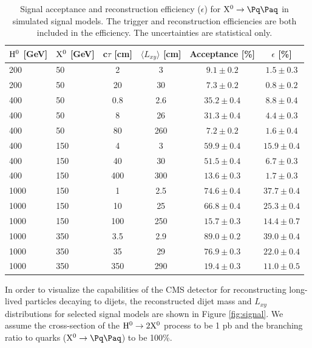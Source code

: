 \begin{table}[htbp]
\caption{
Signal acceptance and reconstruction efficiency ($\epsilon$) for $\X \to \qq$ in simulated signal models.
The trigger and reconstruction efficiencies are both included in the efficiency.
The uncertainties are statistical only.\label{tab:sigeff}}
\centering
\begin{tabular}{llcccc}
\hline
$\mathrm{H}^{0}$ [GeV] & $\mathrm{X^{0}}$ [GeV] & c$\tau$ [cm] & $\langle L_{xy} \rangle$ [cm] & Acceptance [\%] & $\epsilon$ [\%] \\
\hline
200 & 50 & 2 & 3 & $9.1\pm0.2$ & $1.5\pm0.3$ \\
200 & 50 & 20 & 30 & $7.3\pm0.2$ & $0.8\pm0.2$ \\
\hline
400 & 50 & 0.8 & 2.6 & $35.2\pm0.4$ & $8.8\pm0.4$ \\
400 & 50 & 8 & 26 & $31.3\pm0.4$ & $4.4\pm0.3$ \\
400 & 50 & 80 & 260 & $7.2\pm0.2$ & $1.6\pm0.4$ \\
\hline
400 & 150 & 4 & 3 & $59.9\pm0.4$ & $15.9\pm0.4$ \\
400 & 150 & 40 & 30 & $51.5\pm0.4$ & $6.7\pm0.3$ \\
400 & 150 & 400 & 300 & $13.6\pm0.3$ & $1.7\pm0.3$ \\
\hline 
1000 & 150 & 1 & 2.5 & $74.6\pm0.4$ & $37.7\pm0.4$ \\
1000 & 150 & 10 & 25 & $66.8\pm0.4$ & $25.3\pm0.4$ \\ 
1000 & 150 & 100 & 250 & $15.7\pm0.3$ & $14.4\pm0.7$ \\
\hline 
1000 & 350 & 3.5 & 2.9 & $89.0\pm0.2$ & $39.0\pm0.4$ \\
1000 & 350 & 35 & 29 & $76.9\pm0.3$ & $22.0\pm0.4$ \\
1000 & 350 & 350 & 290 & $19.4\pm0.3$ & $11.0\pm0.5$ \\
\hline
\end{tabular}
\end{table}


In order to visualize the capabilities of the CMS detector for reconstructing long-lived particles decaying to 
dijets, 
the reconstructed dijet mass and $L_{xy}$ distributions for selected signal models are shown in Figure
\ref{fig:signal}. We assume the cross-section of the $\mathrm{H}^{0} \to 2\mathrm{X^{0}}$ process to be 1 pb and the branching 
ratio to quarks ($\X \to \qq$) to be 100\%.

